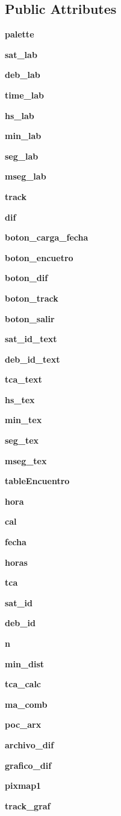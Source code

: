 \subsection*{\-Public \-Attributes}
\begin{DoxyCompactItemize}
\item 
{\bf palette}
\item 
{\bf sat\-\_\-lab}
\item 
{\bf deb\-\_\-lab}
\item 
{\bf time\-\_\-lab}
\item 
{\bf hs\-\_\-lab}
\item 
{\bf min\-\_\-lab}
\item 
{\bf seg\-\_\-lab}
\item 
{\bf mseg\-\_\-lab}
\item 
{\bf track}
\item 
{\bf dif}
\item 
{\bf boton\-\_\-carga\-\_\-fecha}
\item 
{\bf boton\-\_\-encuetro}
\item 
{\bf boton\-\_\-dif}
\item 
{\bf boton\-\_\-track}
\item 
{\bf boton\-\_\-salir}
\item 
{\bf sat\-\_\-id\-\_\-text}
\item 
{\bf deb\-\_\-id\-\_\-text}
\item 
{\bf tca\-\_\-text}
\item 
{\bf hs\-\_\-tex}
\item 
{\bf min\-\_\-tex}
\item 
{\bf seg\-\_\-tex}
\item 
{\bf mseg\-\_\-tex}
\item 
{\bf table\-Encuentro}
\item 
{\bf hora}
\item 
{\bf cal}
\item 
{\bf fecha}
\item 
{\bf horas}
\item 
{\bf tca}
\item 
{\bf sat\-\_\-id}
\item 
{\bf deb\-\_\-id}
\item 
{\bf n}
\item 
{\bf min\-\_\-dist}
\item 
{\bf tca\-\_\-calc}
\item 
{\bf ma\-\_\-comb}
\item 
{\bf poc\-\_\-arx}
\item 
{\bf archivo\-\_\-dif}
\item 
{\bf grafico\-\_\-dif}
\item 
{\bf pixmap1}
\item 
{\bf track\-\_\-graf}
\end{DoxyCompactItemize}


